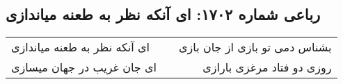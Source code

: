 \begin{center}
\section*{رباعی شماره ۱۷۰۲: ای آنکه نظر به طعنه میاندازی}
\label{sec:1702}
\begin{longtable}{l p{0.5cm} r}
ای آنکه نظر به طعنه میاندازی
&&
بشناس دمی تو بازی از جان بازی
\\
ای جان غریب در جهان میسازی
&&
روزی دو فتاد مرغزی بارازی
\\
\end{longtable}
\end{center}
